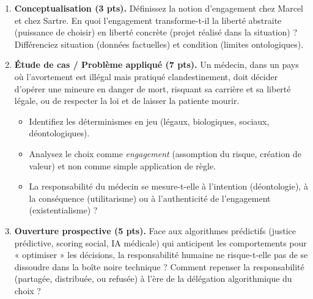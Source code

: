 \documentclass[11pt]{article}
\begin{document}
\begin{exercice}
\begin{enumerate}
    \item \textbf{Conceptualisation (3 pts).} Définissez la notion d'\og engagement \fg{} chez Marcel et chez Sartre. En quoi l'engagement transforme-t-il la liberté abstraite (puissance de choisir) en liberté concrète (projet réalisé dans la situation) ? Différenciez \og situation \fg{} (données factuelles) et \og condition \fg{} (limites ontologiques).
    \item \textbf{Étude de cas / Problème appliqué (7 pts).} Un médecin, dans un pays où l'avortement est illégal mais pratiqué clandestinement, doit décider d'opérer une mineure en danger de mort, risquant sa carrière et sa liberté légale, ou de respecter la loi et de laisser la patiente mourir.
    \begin{itemize}
        \item Identifiez les déterminismes en jeu (légaux, biologiques, sociaux, déontologiques).
        \item Analysez le choix comme \textit{engagement} (assomption du risque, création de valeur) et non comme simple application de règle.
        \item La responsabilité du médecin se mesure-t-elle à l'intention (déontologie), à la conséquence (utilitarisme) ou à l'authenticité de l'engagement (existentialisme) ?
    \end{itemize}
    \item \textbf{Ouverture prospective (5 pts).} Face aux algorithmes prédictifs (justice prédictive, scoring social, IA médicale) qui anticipent les comportements pour « optimiser » les décisions, la responsabilité humaine ne risque-t-elle pas de se dissoudre dans la \og boîte noire \fg{} technique ? Comment repenser la responsabilité (partagée, distribuée, ou refusée) à l'ère de la délégation algorithmique du choix ?
\end{enumerate}
\end{exercice}
\end{document}
